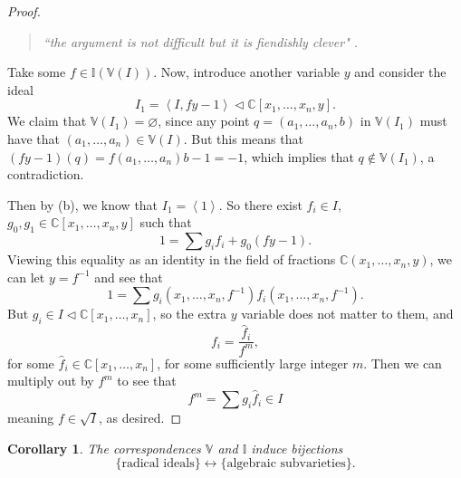 \documentclass[letterpaper]{article}
\newtheorem{theorem}{Theorem}[section]
\newtheorem{corollary}[theorem]{Corollary}
\theoremstyle{definition}
\theoremstyle{remark}
\newcommand\CC{\mathbb{C}}
\newcommand\VV{\mathbb{V}}
\newcommand\II{\mathbb{I}}
\newcommand{\ideal}{\vartriangleleft}
\newcommand{\abrackets}[1]{\left\langle#1\right\rangle}
\begin{document}
\begin{proof}
\begin{quote}
		\textit{``the argument is not difficult \textellipsis but it is fiendishly clever" \cite{aluffi}.}
	\end{quote}
	Take some \(f\in\II(\VV(I))\). Now, introduce another variable \(y\) and consider the ideal \[I_1=\abrackets{I,fy-1}\ideal\CC[x_1,\dots,x_n,y].\] We claim that \(\VV(I_1)=\varnothing\), since any point \(q=(a_1,\dots,a_n,b)\) in \(\VV(I_1)\) must have that \((a_1,\dots,a_n)\in \VV(I)\). But this means that \((fy-1)(q)=f(a_1,\dots,a_n)b-1=-1\), which implies that \(q\not\in\VV(I_1)\), a contradiction. 

	Then by (b), we know that \(I_1=\abrackets{1}\). So there exist \(f_i\in I\), \(g_0,g_1\in \CC[x_1,\dots,x_n,y]\) such that \[1=\sum g_if_i+g_0(fy-1).\] Viewing this equality as an identity in the field of fractions \(\CC(x_1,\dots,x_n,y)\), we can let \(y=f^{-1}\) and see that \[1=\sum g_i(x_1,\dots,x_n,f^{-1})f_i(x_1,\dots,x_n,f^{-1}).\] But \(g_i\in I\ideal\CC[x_1,\dots,x_n]\), so the extra \(y\) variable does not matter to them, and \[f_i=\frac{\hat{f}_i}{f^m},\] for some \(\hat{f}_i\in\CC[x_1,\dots,x_n]\), for some sufficiently large integer \(m\). Then we can multiply out by \(f^m\) to see that \[f^m=\sum g_i\hat{f}_i\in I\] meaning \(f\in\sqrt I\), as desired. 
\end{proof}


\begin{corollary}
    The correspondences $\VV$ and $\II$ induce bijections \[\{\text{radical ideals}\}\longleftrightarrow \{\text{algebraic subvarieties}\}.\]
\end{corollary}







\end{document}
